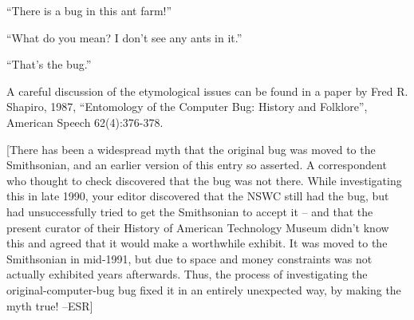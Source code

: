 ``There is a bug in this ant farm!''

``What do you mean? I don't see any ants in it.''

``That's the bug.''

A careful discussion of the etymological issues can be found in a paper by Fred
R. Shapiro, 1987, ``Entomology of the Computer Bug: History and Folklore'',
American Speech 62(4):376-378.

[There has been a widespread myth that the original bug was moved to the
Smithsonian, and an earlier version of this entry so asserted. A correspondent
who thought to check discovered that the bug was not there.  While investigating
this in late 1990, your editor discovered that the NSWC still had the bug, but
had unsuccessfully tried to get the Smithsonian to accept it -- and that the
present curator of their History of American Technology Museum didn't know this
and agreed that it would make a worthwhile exhibit. It was moved to the
Smithsonian in mid-1991, but due to space and money constraints was not actually
exhibited years afterwards.  Thus, the process of investigating the
original-computer-bug bug fixed it in an entirely unexpected way, by making the
myth true! --ESR]

